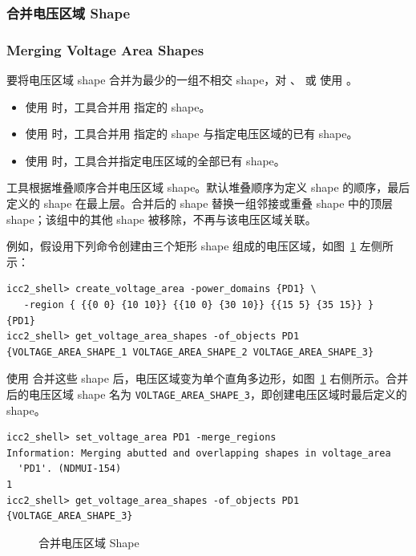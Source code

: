 \subsubsection{合并电压区域 Shape}
\subsubsection*{Merging Voltage Area Shapes}

要将电压区域 shape 合并为最少的一组不相交 shape，对 、 或  使用 。
\begin{itemize}
  \item 使用  时，工具合并用  指定的 shape。
  \item 使用  时，工具合并用  指定的 shape 与指定电压区域的已有 shape。
  \item 使用  时，工具合并指定电压区域的全部已有 shape。
\end{itemize}

工具根据堆叠顺序合并电压区域 shape。默认堆叠顺序为定义 shape 的顺序，最后定义的 shape 在最上层。合并后的 shape 替换一组邻接或重叠 shape 中的顶层 shape；该组中的其他 shape 被移除，不再与该电压区域关联。

例如，假设用下列命令创建由三个矩形 shape 组成的电压区域，如图~\ref{fig:merge-va} 左侧所示：
\begin{lstlisting}
icc2_shell> create_voltage_area -power_domains {PD1} \
   -region { {{0 0} {10 10}} {{10 0} {30 10}} {{15 5} {35 15}} }
{PD1}
icc2_shell> get_voltage_area_shapes -of_objects PD1
{VOLTAGE_AREA_SHAPE_1 VOLTAGE_AREA_SHAPE_2 VOLTAGE_AREA_SHAPE_3}
\end{lstlisting}

使用  合并这些 shape 后，电压区域变为单个直角多边形，如图~\ref{fig:merge-va} 右侧所示。合并后的电压区域 shape 名为 \texttt{VOLTAGE\_AREA\_SHAPE\_3}，即创建电压区域时最后定义的 shape。
\begin{lstlisting}
icc2_shell> set_voltage_area PD1 -merge_regions
Information: Merging abutted and overlapping shapes in voltage_area
  'PD1'. (NDMUI-154)
1
icc2_shell> get_voltage_area_shapes -of_objects PD1
{VOLTAGE_AREA_SHAPE_3}
\end{lstlisting}

\begin{figure}[htbp]
\centering
{}
\caption{合并电压区域 Shape}
\label{fig:merge-va}
\end{figure}


